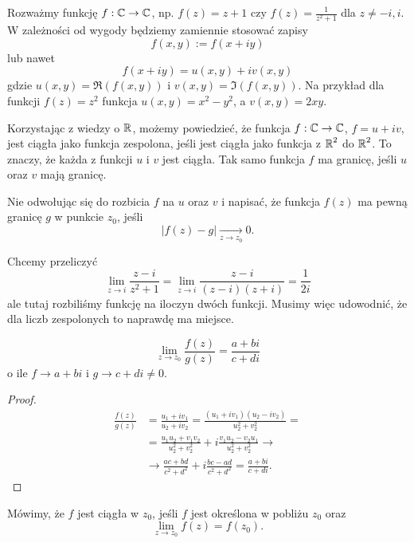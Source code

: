 Rozważmy funkcję $f:\operatorname{\mathbb{C}}\to \operatorname{\mathbb{C}}$, np. $f(z)=z+1$ czy $f(z)=\frac{1}{z^2+1}$ dla $z\neq -i,i$. W zależności od wygody będziemy zamiennie stosować zapisy
$$f(x, y):=f(x+iy)$$
lub nawet
$$f(x+iy)=u(x, y)+iv(x, y)$$
gdzie $u(x, y)=\Re(f(x, y))$ i $v(x, y)=\Im(f(x, y))$. Na przykład dla funkcji $f(z)=z^2$ funkcja $u(x, y)=x^2-y^2$, a $v(x, y)=2xy$.

  
Korzystając z wiedzy o $\operatorname{\mathbb{R}}$, możemy powiedzieć, że funkcja $f:\operatorname{\mathbb{C}}\to\operatorname{\mathbb{C}}$, $f=u+iv$, jest ciągła jako funkcja zespolona, jeśli jest ciągła jako funkcja z $\operatorname{\mathbb{R}}^2$ do $\operatorname{\mathbb{R}}^2$. To znaczy, że każda z funkcji $u$ i $v$ jest ciągła. Tak samo funkcja $f$ ma granicę, jeśli $u$ oraz $v$ mają granicę.

\begin{definition}
  Nie odwołując się do rozbicia $f$ na $u$ oraz $v$ i napisać, że funkcja $f(z)$ ma pewną granicę $g$ w punkcie $z_0$, jeśli
  $$|f(z)-g|\xrightarrow[z\to z_0]{} 0.$$
\end{definition}

\begin{example}
\item Chcemy przeliczyć
  $$\lim\limits_{z\to i}\frac{z-i}{z^2+1}=\lim\limits_{z\to i}\frac{z-i}{(z-i)(z+i)}=\frac{1}{2i}$$
  ale tutaj rozbiliśmy funkcję na iloczyn dwóch funkcji. Musimy więc udowodnić, że dla liczb zespolonych to naprawdę ma miejsce.
\end{example}

\begin{lemma}
  $$\lim\limits_{z\to z_0}\frac{f(z)}{g(z)}=\frac{a+bi}{c+di}$$
  o ile $f\to a+bi$ i $g\to c+di\neq 0$.
\end{lemma}

\begin{proof}
  \begin{align*}
    \frac{f(z)}{g(z)}&=\frac{u_1+iv_1}{u_2+iv_2}=\frac{(u_1+iv_1)(u_2-iv_2)}{u_2^2+v_2^2}=\\ 
                     &=\frac{u_1u_2+v_1v_2}{u_2^2+v_2^2}+i\frac{v_1u_2-v_2u_1}{u_2^2+v_2^2}\to\\ 
                     &\to \frac{ac+bd}{c^2+d^2}+i\frac{bc-ad}{c^2+d^2}=\frac{a+bi}{c+di}.
  \end{align*}
\end{proof}

\begin{definition}
Mówimy, że $f$ jest ciągła w $z_0$, jeśli $f$ jest określona w pobliżu $z_0$ oraz 
$$\lim\limits_{z\to z_0}f(z)=f(z_0).$$
\end{definition}


